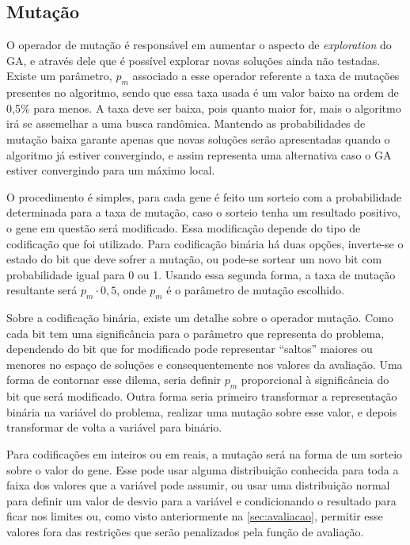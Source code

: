 \subsection{Mutação}
O operador de mutação é responsável em aumentar o aspecto de \textit{exploration} do GA, e através dele que é possível explorar novas soluções ainda não testadas. Existe um parâmetro, \(p_m\) associado a esse operador referente a taxa de mutações presentes no algoritmo, sendo que essa taxa usada é um valor baixo na ordem de 0,5\% para menos. A taxa deve ser baixa, pois quanto maior for, mais o algoritmo irá se assemelhar a uma busca randômica. Mantendo as probabilidades de mutação baixa garante apenas que novas soluções serão apresentadas quando o algoritmo já estiver convergindo, e assim representa uma alternativa caso o GA estiver convergindo para um máximo local.

O procedimento é simples, para cada gene é feito um sorteio com a probabilidade determinada para a taxa de mutação, caso o sorteio tenha um resultado positivo, o gene em questão será modificado. Essa modificação depende do tipo de codificação que foi utilizado. Para codificação binária há duas opções, inverte-se o estado do bit que deve sofrer a mutação, ou pode-se sortear um novo bit com probabilidade igual para 0 ou 1. Usando essa segunda forma, a taxa de mutação resultante será \(p_m \cdot 0,5\), onde \(p_m\) é o parâmetro de mutação escolhido.

Sobre a codificação binária, existe um detalhe sobre o operador mutação. Como cada bit tem uma significância para o parâmetro que representa do problema, dependendo do bit que for modificado pode representar ``saltos'' maiores ou menores no espaço de soluções e consequentemente nos valores da avaliação. Uma forma de contornar esse dilema, seria definir \(p_m\) proporcional à significância do bit que será modificado. Outra forma seria primeiro transformar a representação binária na variável do problema, realizar uma mutação sobre esse valor, e depois transformar de volta a variável para binário.

Para codificações em inteiros ou em reais, a mutação será na forma de um sorteio sobre o valor do gene. Esse pode usar alguma distribuição conhecida para toda a faixa dos valores que a variável pode assumir, ou usar uma distribuição normal para definir um valor de desvio para a variável e condicionando o resultado para ficar nos limites ou, como visto anteriormente na \autoref{sec:avaliacao}, permitir esse valores fora das restrições que serão penalizados pela função de avaliação.

